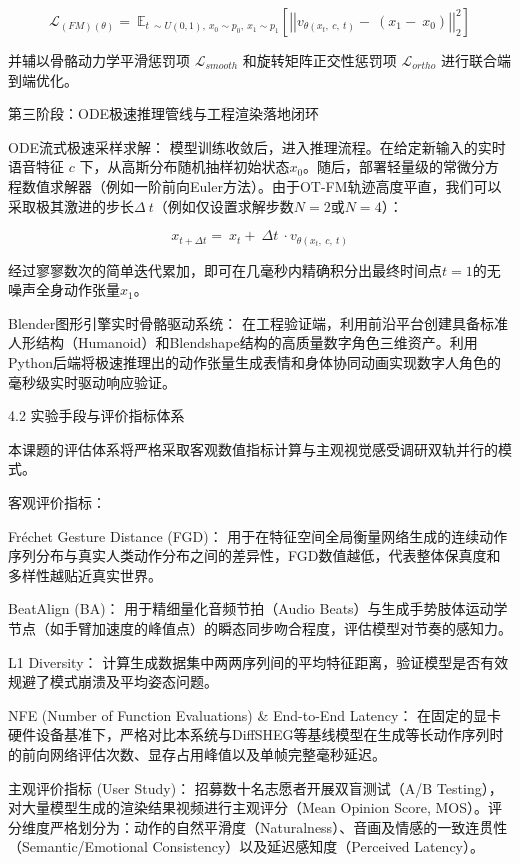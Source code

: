 \documentclass[UTF8]{ctexart}
\begin{document}
\[\mathcal{L}_{(FM)(\theta)} = \ \mathbb{E}_{t\  \sim U(0,1),\ x_{0} \sim p_{0},\ x_{1} \sim p_{1}}\left\lbrack \left| \left| v_{\theta\left( x_{t},\ c,\ t \right)} - \ \left( x_{1} - \ x_{0} \right) \right| \right|_{2}^{2} \right\rbrack\]

并辅以骨骼动力学平滑惩罚项 \(\mathcal{L}_{smooth}\)
和旋转矩阵正交性惩罚项 \(\mathcal{L}_{ortho}\) 进行联合端到端优化。

第三阶段：ODE极速推理管线与工程渲染落地闭环

ODE流式极速采样求解：
模型训练收敛后，进入推理流程。在给定新输入的实时语音特征 \(c\)
下，从高斯分布随机抽样初始状态\(x_{0}\)。随后，部署轻量级的常微分方程数值求解器（例如一阶前向Euler方法）。由于OT-FM轨迹高度平直，我们可以采取极其激进的步长\(\Delta\ t\)（例如仅设置求解步数\(N = 2\)或\(N = 4\)）：

\[x_{t + \Delta t} = \ x_{t} + \ \Delta t\  \cdot v_{\theta\left( x_{t},\ c,\ t \right)}\]

经过寥寥数次的简单迭代累加，即可在几毫秒内精确积分出最终时间点\(t = 1\)的无噪声全身动作张量\(x_{1}\)。

Blender图形引擎实时骨骼驱动系统：
在工程验证端，利用前沿平台创建具备标准人形结构（Humanoid）和Blendshape结构的高质量数字角色三维资产。利用Python后端将极速推理出的动作张量生成表情和身体协同动画实现数字人角色的毫秒级实时驱动响应验证。

4.2 实验手段与评价指标体系

本课题的评估体系将严格采取客观数值指标计算与主观视觉感受调研双轨并行的模式。

客观评价指标：

Fréchet Gesture Distance (FGD)：
用于在特征空间全局衡量网络生成的连续动作序列分布与真实人类动作分布之间的差异性，FGD数值越低，代表整体保真度和多样性越贴近真实世界。

BeatAlign (BA)： 用于精细量化音频节拍（Audio
Beats）与生成手势肢体运动学节点（如手臂加速度的峰值点）的瞬态同步吻合程度，评估模型对节奏的感知力。

L1 Diversity：
计算生成数据集中两两序列间的平均特征距离，验证模型是否有效规避了模式崩溃及平均姿态问题。

NFE (Number of Function Evaluations) \& End-to-End Latency：
在固定的显卡硬件设备基准下，严格对比本系统与DiffSHEG等基线模型在生成等长动作序列时的前向网络评估次数、显存占用峰值以及单帧完整毫秒延迟。

主观评价指标 (User Study)： 招募数十名志愿者开展双盲测试（A/B
Testing），对大量模型生成的渲染结果视频进行主观评分（Mean Opinion Score,
MOS）。评分维度严格划分为：动作的自然平滑度（Naturalness）、音画及情感的一致连贯性（Semantic/Emotional
Consistency）以及延迟感知度（Perceived Latency）。
\end{document}
